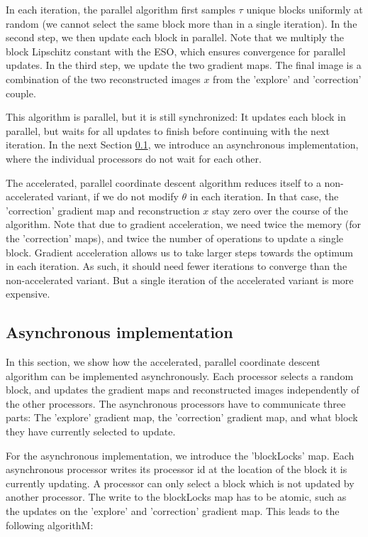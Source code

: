 In each iteration, the parallel algorithm first samples $\tau$ unique blocks uniformly at random (we cannot select the same block more than in a single iteration). In the second step, we then update each block in parallel. Note that we multiply the block Lipschitz constant with the ESO, which ensures convergence for parallel updates. In the third step, we update the two gradient maps. The final image is a combination of the two reconstructed images $x$ from the 'explore' and 'correction' couple.

This algorithm is parallel, but it is still synchronized: It updates each block in parallel, but waits for all updates to finish before continuing with the next iteration. In the next Section \ref{pcdm:async}, we introduce an asynchronous implementation, where the individual processors do not wait for each other.

The accelerated, parallel coordinate descent algorithm reduces itself to a non-accelerated variant, if we do not modify $\theta$ in each iteration. In that case, the 'correction' gradient map and reconstruction $x$ stay zero over the course of the algorithm. Note that due to gradient acceleration, we need twice the memory (for the 'correction' maps), and twice the number of operations to update a single block. Gradient acceleration allows us to take larger steps towards the optimum in each iteration. As such, it should need fewer iterations to converge than the non-accelerated variant. But a single iteration of the accelerated variant is more expensive.


\subsection{Asynchronous implementation}\label{pcdm:async}
In this section, we show how the accelerated, parallel coordinate descent algorithm can be implemented asynchronously. Each processor selects a random block, and updates the gradient maps and reconstructed images independently of the other processors. The asynchronous processors have to communicate three parts: The 'explore' gradient map, the 'correction' gradient map, and what block they have currently selected to update.

For the asynchronous implementation, we introduce the 'blockLocks' map. Each asynchronous processor writes its processor id at the location of the block it is currently updating. A processor can only select a block which is not updated by another processor. The write to the blockLocks map has to be atomic, such as the updates on the 'explore' and 'correction' gradient map. This leads to the following algorithM:


